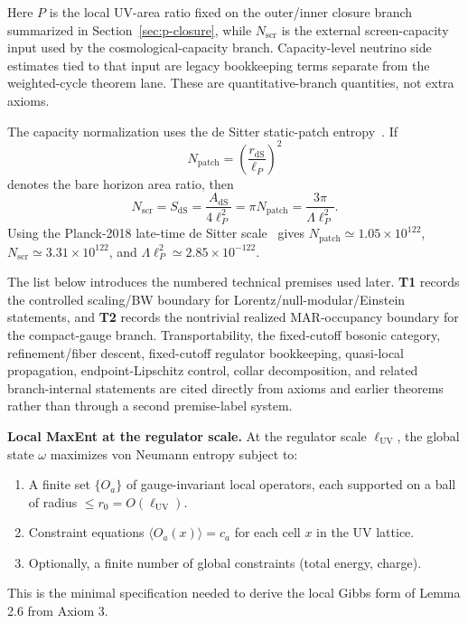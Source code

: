 Here \(P\) is the local UV-area ratio fixed on the outer/inner closure branch summarized in
Section~\ref{sec:p-closure}, while \(N_{\mathrm{scr}}\) is the external screen-capacity input
used by the cosmological-capacity branch. Capacity-level neutrino side estimates tied to that
input are legacy bookkeeping terms separate from the weighted-cycle theorem lane. These are
quantitative-branch quantities, not extra axioms.

The capacity normalization uses the de Sitter static-patch entropy~\cite{gibbonsHawking77}. If
\[
N_{\mathrm{patch}}=\left(\frac{r_{\mathrm{dS}}}{\ell_P}\right)^2
\]
denotes the bare horizon area ratio, then
\[
N_{\mathrm{scr}}=S_{\mathrm{dS}}=\frac{A_{\mathrm{dS}}}{4\ell_P^2}
=\pi N_{\mathrm{patch}}
=\frac{3\pi}{\Lambda\ell_P^2}.
\]
Using the Planck-2018 late-time de Sitter scale~\cite{planck18} gives
\(N_{\mathrm{patch}}\simeq1.05\times10^{122}\),
\(N_{\mathrm{scr}}\simeq3.31\times10^{122}\), and
\(\Lambda\ell_P^2\simeq2.85\times10^{-122}\).

The list below introduces the numbered technical premises used later. \textbf{T1} records the controlled scaling/BW boundary for Lorentz/null-modular/Einstein statements, and \textbf{T2} records the nontrivial realized MAR-occupancy boundary for the compact-gauge branch. Transportability, the fixed-cutoff bosonic category, refinement/fiber descent, fixed-cutoff regulator bookkeeping, quasi-local propagation, endpoint-Lipschitz control, collar decomposition, and related branch-internal statements are cited directly from axioms and earlier theorems rather than through a second premise-label system.

\textbf{Local MaxEnt at the regulator scale.} At the regulator scale \(\ell_{\mathrm{UV}}\), the global state \(\omega\) maximizes von Neumann entropy subject to:

\begin{enumerate}
\def\labelenumi{\arabic{enumi}.}
\tightlist
\item
  A finite set \(\{O_a\}\) of gauge-invariant local operators, each supported on a ball of radius \(\le r_0 = O(\ell_{\mathrm{UV}})\).
\item
  Constraint equations \(\langle O_a(x) \rangle = c_a\) for each cell \(x\) in the UV lattice.
\item
  Optionally, a finite number of global constraints (total energy, charge).
\end{enumerate}

This is the minimal specification needed to derive the local Gibbs form of Lemma 2.6 from Axiom 3.

